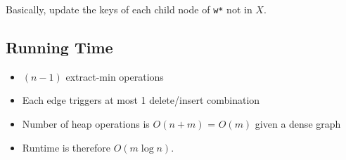 \documentclass[11pt]{article}
\begin{document}
	Basically, update the keys of each child node of \verb|w*| not in $X$.

	\subsection{Running Time}
		\begin{itemize}
			\item $(n-1)$ extract-min operations
			\item Each edge triggers at most 1 delete/insert combination
			\item Number of heap operations is $O(n + m)$ = $O(m)$ given a dense graph
			\item Runtime is therefore $O(m\log n)$.
		\end{itemize}
%		
%		


\end{document}
